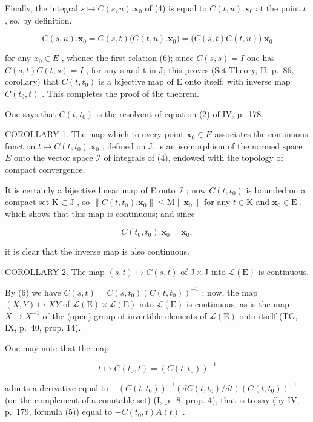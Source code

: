 Finally, the integral \(s \mapsto C(s, u). \mathbf{x}_0\) of (4) is equal to \(C(t, u). \mathbf{x}_0\) at the point \(t\) , so, by definition,

\[
C (s, u). \mathbf {x} _ {0} = C (s, t) \bigl (C (t, u). \mathbf {x} _ {0} \bigr) = \bigl (C (s, t)   C (t, u) \bigr). \mathbf {x} _ {0}
\]

for any \(x_{0} \in E\) , whence the first relation (6); since \(C(s, s) = I\) one has \(C(s, t)C(t, s) = I\) , for any s and t in J; this proves (Set Theory, II, p.~86, corollary) that \(C(t, t_{0})\) is a bijective map of E onto itself, with inverse map \(C(t_{0}, t)\) . This completes the proof of the theorem.

One says that \(C(t, t_0)\) is the resolvent of equation (2) of IV, p.~178.

COROLLARY 1. The map which to every point \(\mathbf{x}_0 \in E\) associates the continuous function \(t \mapsto C(t, t_0). \mathbf{x}_0\) , defined on J, is an isomorphism of the normed space \(E\) onto the vector space \(\mathcal{I}\) of integrals of (4), endowed with the topology of compact convergence.

It is certainly a bijective linear map of E onto \(\mathcal{I}\) ; now \(C(t, t_0)\) is bounded on a compact set \(\mathrm{K} \subset \mathrm{J}\) , so \(\|C(t, t_0). \mathbf{x}_0\| \leqslant \mathrm{M} \| \mathbf{x}_0\|\) for any \(t \in \mathrm{K}\) and \(\mathbf{x}_0 \in \mathrm{E}\) , which shows that this map is continuous; and since

\[
C (t _ {0}, t _ {0}). \mathbf {x} _ {0} = \mathbf {x} _ {0},
\]

it is clear that the inverse map is also continuous.

COROLLARY 2. The map \((s,t)\mapsto C(s,t)\) of \(\mathrm{J}\times \mathrm{J}\) into \(\mathcal{L}(\mathrm{E})\) is continuous.

By (6) we have \(C(s, t) = C(s, t_0) \left( C(t, t_0) \right)^{-1}\) ; now, the map \((X, Y) \mapsto XY\) of \(\mathcal{L}(\mathrm{E}) \times \mathcal{L}(\mathrm{E})\) into \(\mathcal{L}(\mathrm{E})\) is continuous, as is the map \(X \mapsto X^{-1}\) of the (open) group of invertible elements of \(\mathcal{L}(\mathrm{E})\) onto itself (TG, IX, p.~40, prop. 14).

One may note that the map

\[
t \mapsto C (t _ {0}, t) = (C (t, t _ {0})) ^ {- 1}
\]

admits a derivative equal to \(-(C(t,t_{0}))^{-1}(dC(t,t_{0})/dt)(C(t,t_{0}))^{-1}\) (on the complement of a countable set) (I, p.~8, prop. 4), that is to say (by IV, p.~179, formula (5)) equal to \(-C(t_{0},t)A(t)\) .

